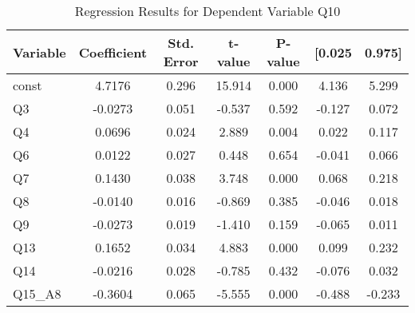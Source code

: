 \begin{table}[H]
  \centering
  \caption{Regression Results for Dependent Variable Q10}\label{tab:regression_q10}
  \begin{tabular}{lcccccc}
    \toprule
    \textbf{Variable} & \textbf{Coefficient} & \textbf{Std. Error} & \textbf{t-value} & \textbf{P-value} & \textbf{[0.025} & \textbf{0.975]} \\
    \midrule
    const   & 4.7176 & 0.296 & 15.914 & 0.000 & 4.136 & 5.299 \\
    Q3      & -0.0273 & 0.051 & -0.537 & 0.592 & -0.127 & 0.072 \\
    Q4      & 0.0696 & 0.024 & 2.889 & 0.004 & 0.022 & 0.117 \\
    Q6      & 0.0122 & 0.027 & 0.448 & 0.654 & -0.041 & 0.066 \\
    Q7      & 0.1430 & 0.038 & 3.748 & 0.000 & 0.068 & 0.218 \\
    Q8      & -0.0140 & 0.016 & -0.869 & 0.385 & -0.046 & 0.018 \\
    Q9      & -0.0273 & 0.019 & -1.410 & 0.159 & -0.065 & 0.011 \\
    Q13     & 0.1652 & 0.034 & 4.883 & 0.000 & 0.099 & 0.232 \\
    Q14     & -0.0216 & 0.028 & -0.785 & 0.432 & -0.076 & 0.032 \\
    Q15\_A8 & -0.3604 & 0.065 & -5.555 & 0.000 & -0.488 & -0.233 \\
    \bottomrule
  \end{tabular}
\end{table}